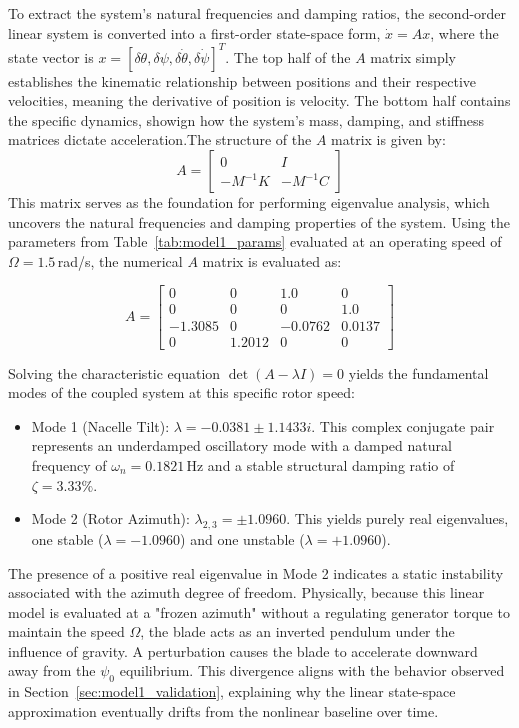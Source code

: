 \documentclass[final,onecolumn]{IEEEtran}
\begin{document}
To extract the system's natural frequencies and damping ratios, the second-order linear system is converted into a first-order state-space form, $\dot{x} = A x$, where the state vector is $x = [\delta\theta, \delta\psi, \delta\dot{\theta}, \delta\dot{\psi}]^T$. The top half of the $A$ matrix simply establishes the kinematic relationship between positions and their respective velocities, meaning the derivative of position is velocity. The bottom half contains the specific dynamics, showign how the system's mass, damping, and stiffness matrices dictate acceleration.The structure of the $A$ matrix is given by:$$A = \begin{bmatrix} 0 & I \\ -M^{-1}K & -M^{-1}C \end{bmatrix}$$This matrix serves as the foundation for performing eigenvalue analysis, which uncovers the natural frequencies and damping properties of the system. Using the parameters from Table~\ref{tab:model1_params} evaluated at an operating speed of $\Omega = 1.5$\,rad/s, the numerical $A$ matrix is evaluated as:

\begin{equation}
    A = \begin{bmatrix}
        0       & 0      & 1.0     & 0      \\
        0       & 0      & 0       & 1.0    \\
        -1.3085 & 0      & -0.0762 & 0.0137 \\
        0       & 1.2012 & 0       & 0
    \end{bmatrix}
\end{equation}

Solving the characteristic equation $\det(A - \lambda I) = 0$ yields the fundamental modes of the coupled system at this specific rotor speed:

\begin{itemize}
    \item Mode 1 (Nacelle Tilt): $\lambda = -0.0381 \pm 1.1433i$. This complex conjugate pair represents an underdamped oscillatory mode with a damped natural frequency of $\omega_n = 0.1821$\,Hz and a stable structural damping ratio of $\zeta = 3.33\%$.
    \item Mode 2 (Rotor Azimuth): $\lambda_{2,3} = \pm 1.0960$. This yields purely real eigenvalues, one stable ($\lambda = -1.0960$) and one unstable ($\lambda = +1.0960$).
\end{itemize}

The presence of a positive real eigenvalue in Mode 2 indicates a static instability associated with the azimuth degree of freedom. Physically, because this linear model is evaluated at a "frozen azimuth" without a regulating generator torque to maintain the speed $\Omega$, the blade acts as an inverted pendulum under the influence of gravity. A perturbation causes the blade to accelerate downward away from the $\psi_0$ equilibrium. This divergence aligns with the behavior observed in Section~\ref{sec:model1_validation}, explaining why the linear state-space approximation eventually drifts from the nonlinear baseline over time.
\end{document}

